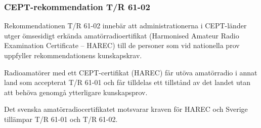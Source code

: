\subsubsection{CEPT-rekommendation T/R 61-02}

Rekommendationen T/R 61-02 \cite{TR6102} innebär att administrationerna i
CEPT-länder utger ömsesidigt erkända amatörradioertifikat (Harmonised Amateur Radio Examination Certificate -- HAREC) till de personer som vid nationella prov uppfyller
rekommendationens kunskapskrav.

Radioamatörer med ett CEPT-certifikat (HAREC) får utöva amatörradio i annat land
som accepterat T/R 61-01 och får tilldelas ett tillstånd av det
landet utan att behöva genomgå ytterligare kunskapsprov.

Det svenska amatörradiocertifikatet motsvarar kraven för HAREC och Sverige
tillämpar T/R 61-01 och T/R 61-02.

